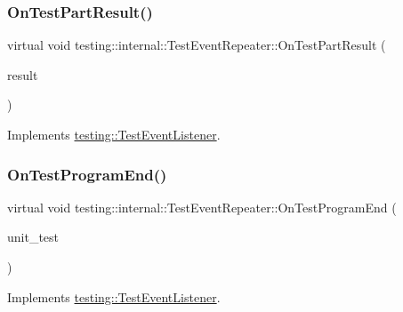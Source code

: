 \subsubsection{\texorpdfstring{On\+Test\+Part\+Result()}{OnTestPartResult()}}
{\footnotesize\ttfamily virtual void testing\+::internal\+::\+Test\+Event\+Repeater\+::\+On\+Test\+Part\+Result (\begin{DoxyParamCaption}\item[{const \hyperlink{classtesting_1_1_test_part_result}{Test\+Part\+Result} \&}]{result }\end{DoxyParamCaption})\hspace{0.3cm}{\ttfamily [virtual]}}



Implements \hyperlink{classtesting_1_1_test_event_listener_a054f8705c883fa120b91473aff38f2ee}{testing\+::\+Test\+Event\+Listener}.

\mbox{\label{classtesting_1_1internal_1_1_test_event_repeater_a4622616259747dbcc23f5ee39ef99ec0}} 
\subsubsection{\texorpdfstring{On\+Test\+Program\+End()}{OnTestProgramEnd()}}
{\footnotesize\ttfamily virtual void testing\+::internal\+::\+Test\+Event\+Repeater\+::\+On\+Test\+Program\+End (\begin{DoxyParamCaption}\item[{const \hyperlink{classtesting_1_1_unit_test}{Unit\+Test} \&}]{unit\+\_\+test }\end{DoxyParamCaption})\hspace{0.3cm}{\ttfamily [virtual]}}



Implements \hyperlink{classtesting_1_1_test_event_listener_ad15b6246d94c268e233487a86463ef3d}{testing\+::\+Test\+Event\+Listener}.

\mbox{\label{classtesting_1_1internal_1_1_test_event_repeater_a15ee2ff051063088d3a89a266d5ffcc4}} 
